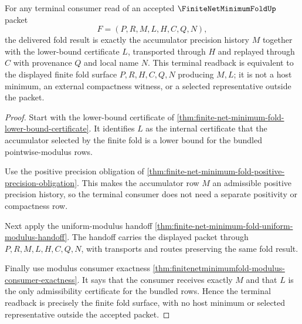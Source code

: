 \begin{theorem}
\label{thm:finite-net-minimum-fold-terminal-readback}
For any terminal consumer read of an accepted $\FiniteNetMinimumFoldUp$ packet
$$
F=(P,R,M,L,H,C,Q,N),
$$
the delivered fold result is exactly the accumulator precision history $M$ together with the lower-bound certificate $L$, transported through $H$ and replayed through $C$ with provenance $Q$ and local name $N$. This terminal readback is equivalent to the displayed finite fold surface $P,R,H,C,Q,N$ producing $M,L$; it is not a host minimum, an external compactness witness, or a selected representative outside the packet.
\end{theorem}
\begin{proof}
Start with the lower-bound certificate of \autoref{thm:finite-net-minimum-fold-lower-bound-certificate}. It identifies $L$ as the internal certificate that the accumulator selected by the finite fold is a lower bound for the bundled pointwise-modulus rows.

Use the positive precision obligation of \autoref{thm:finite-net-minimum-fold-positive-precision-obligation}. This makes the accumulator row $M$ an admissible positive precision history, so the terminal consumer does not need a separate positivity or compactness row.

Next apply the uniform-modulus handoff \autoref{thm:finite-net-minimum-fold-uniform-modulus-handoff}. The handoff carries the displayed packet through $P,R,M,L,H,C,Q,N$, with transports and routes preserving the same fold result.

Finally use modulus consumer exactness \autoref{thm:finitenetminimumfold-modulus-consumer-exactness}. It says that the consumer receives exactly $M$ and that $L$ is the only admissibility certificate for the bundled rows. Hence the terminal readback is precisely the finite fold surface, with no host minimum or selected representative outside the accepted packet.
\end{proof}

